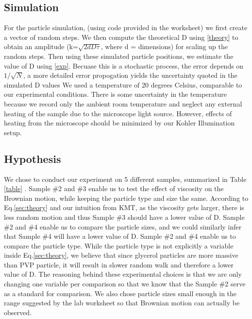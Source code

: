 \documentclass[iop,revtex4]{emulateapj_mod}
\begin{document}
\subsection{Simulation}
For the particle simulation,  (using code provided in the worksheet) we first create a vector of random steps. We then compute the theoretical D using \ref{theory} to obtain an amplitude (k=$\sqrt{2dD\tau}$, where d = dimensions) for scaling up the random steps. Then using these simulated particle positions, we estimate the value of D using \ref{exp}. Becuase this is a stochastic process, the error depends on $1/\sqrt{N}$, a more detailed error propogation yields the uncertainty quoted in the simulated D values
We used a temperature of 20 degrees Celsius, comparable to our experimental conditions. There is some uncertainty in the temperature because we record only the ambient room temperature and neglect any external heating of the sample due to the microscope light source. However, effects of heating from the microscope should be minimized by our Kohler Illumination setup.
\subsection{Hypothesis}
 We chose to conduct our experiment on  5 different samples, summarized in Table  \ref{table} . Sample \#2 and \#3 enable us to test the effect of viscosity on the Brownian motion, while keeping the particle type and size the same. According to Eq.\ref{sec:theory} and our intuition from KMT, as the viscosity gets larger, there is less random motion and thus Sample \#3 should have a lower value of D.  Sample \#2 and \#4 enable us to compare the particle sizes, and we could similarly infer that Sample \#4 will have a lower value of D. Sample \#2 and \#4 enable us to compare the particle type. While the particle type is not explicitly a variable inside Eq.\ref{sec:theory}, we believe that since glycerol particles are more massive than PVP particle, it will result in slower random walk and therefore a lower value of D. The reasoning behind these experimental choices is that we are only changing one variable per comparison so that we know that the Sample \#2  serve as a standard for comparison. We also chose particle sizes small enough in the range suggested by the lab worksheet so that Brownian motion can actually be observed.
\end{document}
